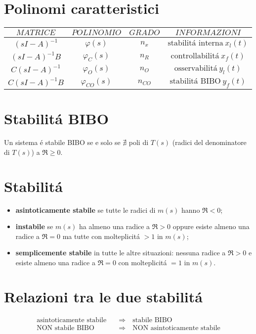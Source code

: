 \documentclass[../main.tex]{subfiles}
\begin{document}
	\section{Polinomi caratteristici}
		\bgroup
		\def\arraystretch{0.2} %
		\begin{tabular}{|>{\centering\arraybackslash}m{1.5in}|>{\centering\arraybackslash}m{1in}|>{\centering\arraybackslash}m{1in}|>{\centering\arraybackslash}m{1.5in}|}
			\hline
			$$ MATRICE $$ & $$ POLINOMIO $$ & $$ GRADO $$ & $$ INFORMAZIONI $$\\
			\hline
			$$ (sI-A)^{-1} $$ & $$ \varphi(s) $$ & $$ n_x $$ & $$ \text{stabilit\'a interna}\ x_l(t) $$ \\
			\hline
			$$ (sI-A)^{-1}B $$ & $$ \varphi_C(s) $$ & $$ n_R $$ & $$ \text{controllabilit\'a}\ x_f(t) $$ \\
			\hline
			$$ C(sI-A)^{-1} $$ & $$ \varphi_O(s) $$ & $$ n_O $$ & $$ \text{osservabilit\'a}\ y_l(t) $$ \\
			\hline
			$$ C(sI-A)^{-1}B $$ & $$ \varphi_{CO}(s) $$ & $$ n_{CO} $$ & $$ \text{stabilit\'a BIBO}\ y_f(t) $$ \\
			\hline
		\end{tabular}
		\egroup
		
	\section{Stabilit\'a BIBO}
		Un sistema \'{e} stabile BIBO se e solo se $ \nexists $ poli di $ T(s) $ (radici del denominatore di $ T(s) $) a $ \Re \geq 0 $.
		
	\section{Stabilit\'a}
		\begin{itemize}
			\item
				\textbf{asintoticamente stabile} se tutte le radici di $ m(s) $ hanno $ \Re < 0 $;
			\item
				\textbf{instabile} se $ m(s) $ ha almeno una radice a $ \Re > 0 $ oppure esiste almeno una radice a $ \Re = 0 $ ma tutte con molteplicit\'a $ >1 $ in $ m(s) $;
			\item
				\textbf{semplicemente stabile} in tutte le altre situazioni: nessuna radice a $ \Re > 0 $ e esiste almeno una radice a $ \Re = 0 $ con molteplicit\'a $ =1 $ in $ m(s) $.
		\end{itemize}
	
	\section{Relazioni tra le due stabilit\'a}
		\[
			\begin{aligned}
				\text{asintoticamente stabile} &\quad\Rightarrow\quad \text{stabile BIBO}
				\\
				\text{NON stabile BIBO} &\quad\Rightarrow\quad \text{NON asintoticamente stabile}
			\end{aligned}
		\]
\end{document}
